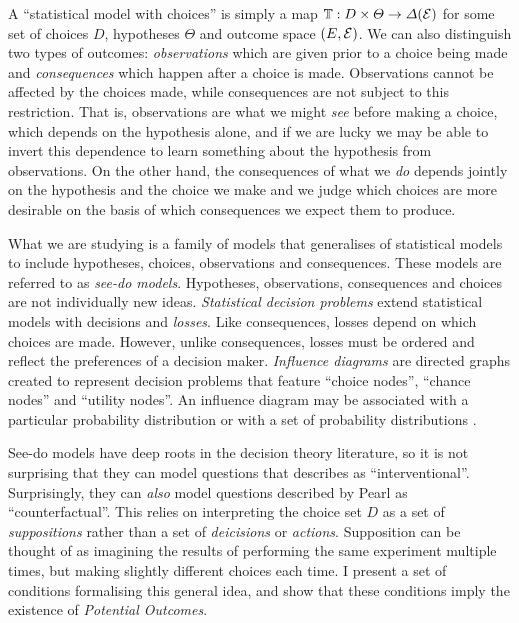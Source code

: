 A ``statistical model with choices'' is simply a map $\mathbb{T}:D\times \Theta\to \Delta(\mathcal{E})$ for some set of choices $D$, hypotheses $\Theta$ and outcome space $(E,\mathcal{E})$. We can also distinguish two types of outcomes: \emph{observations} which are given prior to a choice being made and \emph{consequences} which happen after a choice is made. Observations cannot be affected by the choices made, while consequences are not subject to this restriction. That is, observations are what we might \emph{see} before making a choice, which depends on the hypothesis alone, and if we are lucky we may be able to invert this dependence to learn something about the hypothesis from observations. On the other hand, the consequences of what we \emph{do} depends jointly on the hypothesis and the choice we make and we judge which choices are more desirable on the basis of which consequences we expect them to produce. 

What we are studying is a family of models that generalises of statistical models to include hypotheses, choices, observations and consequences. These models are referred to as \emph{see-do models}. Hypotheses, observations, consequences and choices are not individually new ideas. \emph{Statistical decision problems} \citep{wald_statistical_1950,savage_foundations_1972} extend statistical models with decisions and \emph{losses}. Like consequences, losses depend on which choices are made. However, unlike consequences, losses must be ordered and reflect the preferences of a decision maker. \emph{Influence diagrams} are directed graphs created to represent decision problems that feature ``choice nodes'', ``chance nodes'' and ``utility nodes''. An influence diagram may be associated with a particular probability distribution \cite{nilsson_evaluating_2013} or with a set of probability distributions \cite{dawid_influence_2002}.

See-do models have deep roots in the decision theory literature, so it is not surprising that they can model questions that \citet{pearl_causality:_2009} describes as ``interventional''. Surprisingly, they can \emph{also} model questions described by Pearl as ``counterfactual''. This relies on interpreting the choice set $D$ as a set of \emph{suppositions} rather than a set of \emph{deicisions} or \emph{actions}. Supposition can be thought of as imagining the results of performing the same experiment multiple times, but making slightly different choices each time. I present a set of conditions formalising this general idea, and show that these conditions imply the existence of \emph{Potential Outcomes}. 

